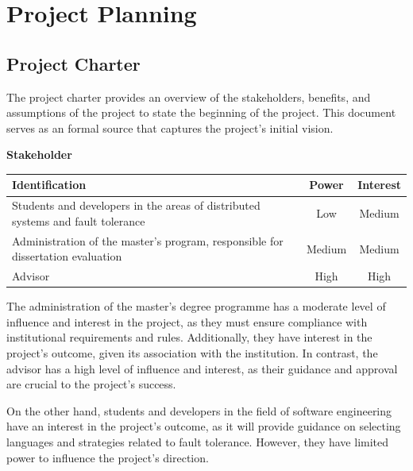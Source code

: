 % 
\chapter{Project Planning} %


\section{Project Charter}

The project charter provides an overview of the stakeholders, benefits, and assumptions of the project to state the beginning of the project. This document serves as an formal source that captures the project's initial vision.

\noindent \textbf{Stakeholder}

\begin{table}[h!]
      \centering
      \begin{tabular}{|p{11cm}|c|c|}
            \hline
            \textbf{Identification}                                                         & \textbf{Power} & \textbf{Interest} \\ \hline
            Students and developers in the areas of distributed systems and fault tolerance & Low            & Medium            \\ \hline
            Administration of the master's program, responsible for dissertation evaluation & Medium         & Medium            \\ \hline
            Advisor                                                                         & High           & High              \\ \hline
      \end{tabular}
\end{table}

The administration of the master's degree programme has a moderate level of influence and interest in the project, as they must ensure compliance with institutional requirements and rules. Additionally, they have interest in the project's outcome, given its association with the institution. In contrast, the advisor has a high level of influence and interest, as their guidance and approval are crucial to the project's success. 

On the other hand, students and developers in the field of software engineering have an interest in the project's outcome, as it will provide guidance on selecting languages and strategies related to fault tolerance. However, they have limited power to influence the project's direction.

